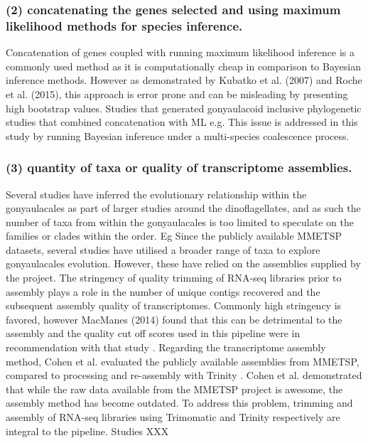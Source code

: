 \documentclass[12pt]{article}
\begin{document}
\subsubsection*{(2) concatenating the genes selected and using maximum likelihood methods for species inference.}
Concatenation of genes coupled with running maximum likelihood inference is a commonly used method as it is computationally cheap in comparison to Bayesian inference methods. 
However as demonstrated by Kubatko et al. (2007) and Roche et al. (2015), this approach is error prone and can be misleading by presenting high bootstrap values.
Studies that generated gonyaulacoid inclusive phylogenetic studies that combined concatenation with ML e.g. \cite{shalchian2006combined,zhang2007three,saldarriaga2004molecular,murray2005improving,hoppenrath2010dinoflagellate}
This issue is addressed in this study by running Bayesian inference under a multi-species coalescence process.
\subsubsection*{(3) quantity of taxa or quality of transcriptome assemblies.}
Several studies have inferred the evolutionary relationship within the gonyaulacales as part of larger studies around the dinoflagellates, and as such the number of taxa from within the gonyaulacales is too limited to speculate on the families or clades within the order. Eg \cite{shalchian2006combined,zhang2007three,saldarriaga2004molecular,hoppenrath2010dinoflagellate,murray2005improving}
Since the publicly available MMETSP datasets, several studies have utilised a broader range of taxa to explore gonyaulacales evolution. 
However, these have relied on the assemblies supplied by the project. 
The stringency of quality trimming of RNA-seq libraries prior to assembly plays a role in the number of unique contigs recovered and the subsequent assembly quality of transcriptomes. 
Commonly high stringency is favored, however MacManes (2014) found that this can be detrimental to the assembly and the quality cut off scores used in this pipeline were in recommendation with that study \cite{macmanes2014optimal}.
Regarding the transcriptome assembly method, Cohen et al. evaluated the publicly available assemblies from MMETSP, compared to processing and re-assembly with Trinity \cite{cohen-reass}. 
Cohen et al. demonstrated that while the raw data available from the MMETSP project is awesome, the assembly method has become outdated. 
To address this problem, trimming and assembly of RNA-seq libraries using Trimomatic and Trinity respectively are integral to the pipeline.
Studies XXX
\end{document}
